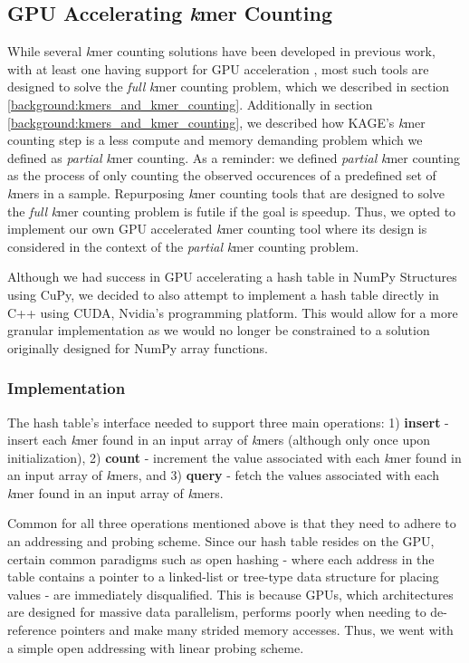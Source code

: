 \subsection{GPU Accelerating \textit{k}mer Counting} \label{methods:gpu_accelerating_kmer_counting}
While several \textit{k}mer counting solutions have been developed in previous work, with at least one having support for GPU acceleration \cite{kmer_counting_tools}, most such tools are designed to solve the \textit{full} \textit{k}mer counting problem, which we described in section \ref{background:kmers_and_kmer_counting}.
Additionally in section \ref{background:kmers_and_kmer_counting}, we described how KAGE's \textit{k}mer counting step is a less compute and memory demanding problem which we defined as \textit{partial} \textit{k}mer counting.
As a reminder: we defined \textit{partial} \textit{k}mer counting as the process of only counting the observed occurences of a predefined set of \textit{k}mers in a sample.
Repurposing \textit{k}mer counting tools that are designed to solve the \textit{full} \textit{k}mer counting problem is futile if the goal is speedup.
Thus, we opted to implement our own GPU accelerated \textit{k}mer counting tool where its design is considered in the context of the \textit{partial} \textit{k}mer counting problem.

Although we had success in GPU accelerating a hash table in NumPy Structures using CuPy, we decided to also attempt to implement a hash table directly in C++ using CUDA, Nvidia's programming platform.
This would allow for a more granular implementation as we would no longer be constrained to a solution originally designed for NumPy array functions.

\subsubsection{Implementation}
The hash table's interface needed to support three main operations: 1) \textbf{insert} - insert each \textit{k}mer found in an input array of \textit{k}mers (although only once upon initialization), 2) \textbf{count} - increment the value associated with each \textit{k}mer found in an input array of \textit{k}mers, and 3) \textbf{query} - fetch the values associated with each \textit{k}mer found in an input array of \textit{k}mers.

Common for all three operations mentioned above is that they need to adhere to an addressing and probing scheme.
Since our hash table resides on the GPU, certain common paradigms such as open hashing - where each address in the table contains a pointer to a linked-list or tree-type data structure for placing values - are immediately disqualified.
This is because GPUs, which architectures are designed for massive data parallelism, performs poorly when needing to de-reference pointers and make many strided memory accesses.
Thus, we went with a simple open addressing with linear probing scheme. 

